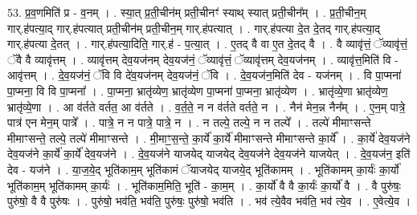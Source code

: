 \documentclass[17pt]{extarticle}
\begin{document}
53. प्र॒व॒णमिति॑ प्र - व॒नम् । . स्या॒त् प्र॒ती॒चीन॑म् प्रती॒चीनꣳ॑ स्याथ् स्यात् प्रती॒चीन᳚म् । . प्र॒ती॒चीन॒म् गार्.ह॑पत्या॒द् गार्.ह॑पत्यात् प्रती॒चीन॑म् प्रती॒चीन॒म् गार्.ह॑पत्यात् । . गार्.ह॑पत्या दे॒त दे॒तद् गार्.ह॑पत्या॒द् गार्.ह॑पत्या दे॒तत् । . गार्.ह॑पत्या॒दिति॒ गार्.ह॑ - प॒त्या॒त् । . ए॒तद् वै वा ए॒त दे॒तद् वै । . वै व्यावृ॑त्तं॒ ॅव्यावृ॑त्तं॒ ॅवै वै व्यावृ॑त्तम् । . व्यावृ॑त्तम् देव॒यज॑नम् देव॒यज॑नं॒ ॅव्यावृ॑त्तं॒ ॅव्यावृ॑त्तम् देव॒यज॑नम् । . व्यावृ॑त्त॒मिति॑ वि - आवृ॑त्तम् । . दे॒व॒यज॑नं॒ ॅवि वि दे॑व॒यज॑नम् देव॒यज॑नं॒ ॅवि । . दे॒व॒यज॑न॒मिति॑ देव - यज॑नम् । . वि पा॒प्मना॑ पा॒प्मना॒ वि वि पा॒प्मना᳚ । . पा॒प्मना॒ भ्रातृ॑व्येण॒ भ्रातृ॑व्येण पा॒प्मना॑ पा॒प्मना॒ भ्रातृ॑व्येण । . भ्रातृ॑व्ये॒णा भ्रातृ॑व्येण॒ भ्रातृ॑व्ये॒णा । . आ व॑र्तते वर्तत॒ आ व॑र्तते । . व॒र्त॒ते॒ न न व॑र्तते वर्तते॒ न । . नैन॑ मेन॒न्न नैन᳚म् । . ए॒न॒म् पात्रे॒ पात्र॑ एन मेन॒म् पात्रे᳚ । . पात्रे॒ न न पात्रे॒ पात्रे॒ न । . न तल्पे॒ तल्पे॒ न न तल्पे᳚ । . तल्पे॑ मीमाꣳसन्ते मीमाꣳसन्ते॒ तल्पे॒ तल्पे॑ मीमाꣳसन्ते । . मी॒माꣳ॒॒स॒न्ते॒ का॒र्ये॑ का॒र्ये॑ मीमाꣳसन्ते मीमाꣳसन्ते का॒र्ये᳚ । . का॒र्ये॑ देव॒यज॑ने देव॒यज॑ने का॒र्ये॑ का॒र्ये॑ देव॒यज॑ने । . दे॒व॒यज॑ने याजयेद् याजयेद् देव॒यज॑ने देव॒यज॑ने याजयेत् । . दे॒व॒यज॑न॒ इति॑ देव - यज॑ने । . या॒ज॒ये॒द् भूति॑काम॒म् भूति॑कामं ॅयाजयेद् याजये॒द् भूति॑कामम् । . भूति॑कामम् का॒र्यः॑ का॒र्यो॑ भूति॑काम॒म् भूति॑कामम् का॒र्यः॑ । . भूति॑काम॒मिति॒ भूति॑ - का॒म॒म् । . का॒र्यो॑ वै वै का॒र्यः॑ का॒र्यो॑ वै । . वै पुरु॑षः॒ पुरु॑षो॒ वै वै पुरु॑षः । . पुरु॑षो॒ भव॑ति॒ भव॑ति॒ पुरु॑षः॒ पुरु॑षो॒ भव॑ति । . भव॑ त्ये॒वैव भव॑ति॒ भव॑ त्ये॒व । . ए॒वेत्ये॒व । \newline
\end{document}
